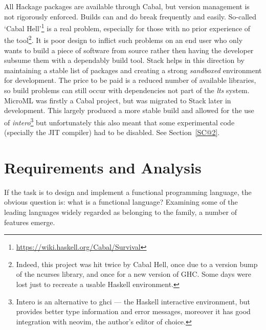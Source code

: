 \documentclass[12pt, a4paper]{report}
\begin{document}
All Hackage packages are available through Cabal, but version management is not
rigorously enforced. Builds can and do break frequently and easily. So-called `Cabal
Hell'\footnote{\url{https://wiki.haskell.org/Cabal/Survival}} is a real problem, especially for
those with no prior experience of the tool\footnote{Indeed, this project was hit twice by Cabal
Hell, once due to a version bump of the ncurses library, and once for a new version of GHC\@.
Some days were lost just to recreate a usable Haskell environment.}. It is poor design to inflict
such problems on an end user who only wants to build a piece of software from source rather then
having the developer subsume them with a dependably build tool. Stack helps in this direction by
maintaining a stable list of packages and creating a strong \textit{sandboxed} environment for
development. The price to be paid is a reduced number of available libraries, so build problems
can still occur with dependencies not part of the \textit{\gls{lts}} system. MicroML was firstly a Cabal
project, but was migrated to Stack later in development. This largely produced a more stable build
and allowed for the use of \textit{intero}\footnote{Intero is an alternative to \gls{ghci} --- the Haskell
interactive environment, but provides better type information and error messages, moreover it has
good integration with neovim, the author's editor of choice.} but unfortunately this also meant that some
experimental code (specially the JIT compiler) had to be disabled. See Section~\ref{SC@2}.

\chapter{Requirements and Analysis}

If the task is to design and implement a functional programming language, the obvious question is:
what is a functional language? Examining some of the leading languages widely regarded as belonging
to the family, a number of features emerge.
\end{document}
